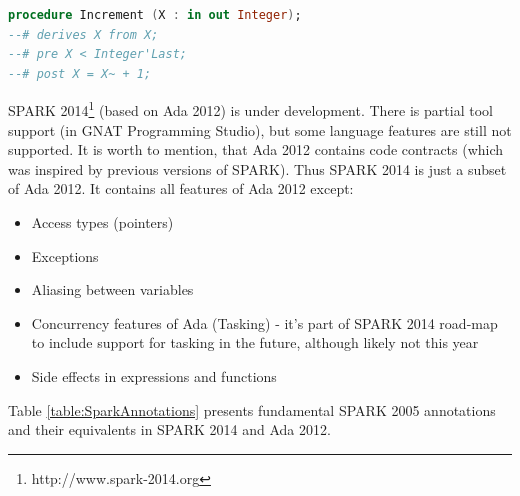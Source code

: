 \begin{lstlisting}[language=ada, frame=single, gobble=0, caption={Sample SPARK procedure with code contracts}]
procedure Increment (X : in out Integer);
--# derives X from X;
--# pre X < Integer'Last;
--# post X = X~ + 1;
\end{lstlisting} 
\label{listing:SPARK2005Contracts}

SPARK 2014\footnote{http://www.spark-2014.org} (based on Ada 2012) is under development. There is partial tool support (in GNAT Programming Studio), but some language features are still not supported. It is worth to mention, that Ada 2012 contains code contracts (which was inspired by previous versions of SPARK). Thus SPARK 2014 is just a subset of Ada 2012. \cite{Spark2014:Paper} It contains all features of Ada 2012 except:
\begin{itemize} \itemsep1pt \parskip0pt 
 	\item Access types (pointers)
 	\item Exceptions
	\item Aliasing between variables
	\item Concurrency features of Ada (Tasking) - it's part of SPARK 2014 road-map to include support for tasking in the future, although likely not this year
	\item Side effects in expressions and functions
\end{itemize}


Table \ref{table:SparkAnnotations} presents fundamental SPARK 2005 annotations and their equivalents in SPARK 2014 and Ada 2012.

